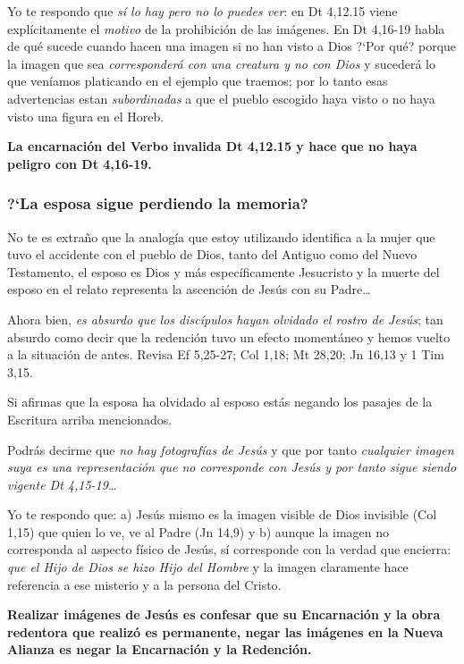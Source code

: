 \documentclass{article}
\begin{document}
Yo te respondo que \emph{s\'{i} lo hay pero no lo puedes ver}: en Dt 4,12.15 viene expl\'{i}citamente el \emph{motivo} de la prohibici\'on de las im\'agenes. En Dt 4,16-19 habla de qu\'e sucede cuando hacen una imagen si no han visto a Dios ?`Por qu\'e? porque la imagen que sea \emph{corresponder\'a con una creatura y no con Dios} y suceder\'a lo que ven\'{i}amos platicando en el ejemplo que traemos; por lo tanto esas advertencias estan \emph{subordinadas} a que el pueblo escogido haya visto o no haya visto una figura en el Horeb.

\textbf{La encarnaci\'on del Verbo invalida Dt 4,12.15 y hace que no haya peligro con Dt 4,16-19.}

\subsubsection{?`La esposa sigue perdiendo la memoria?}

No te es extra\~no que la analog\'{i}a que estoy utilizando identifica a la mujer que tuvo el accidente con el pueblo de Dios, tanto del Antiguo como del Nuevo Testamento, el esposo es Dios y m\'as espec\'{i}ficamente Jesucristo y la muerte del esposo en el relato representa la ascenci\'on de Jes\'us con su Padre\ldots

Ahora bien, \emph{es absurdo que los disc\'{i}pulos hayan olvidado el rostro de Jes\'us}; tan absurdo como decir que la redenci\'on tuvo un efecto moment\'aneo y hemos vuelto a la situaci\'on de antes. Revisa Ef 5,25-27; Col 1,18; Mt 28,20; Jn 16,13 y 1 Tim 3,15.

Si afirmas que la esposa ha olvidado al esposo est\'as negando los pasajes de la Escritura arriba mencionados.

Podr\'as decirme que \emph{no hay fotograf\'{i}as de Jes\'us} y que por tanto \emph{cualquier imagen suya es una representaci\'on que no corresponde con Jes\'us y por tanto sigue siendo vigente Dt 4,15-19}\ldots 

Yo te respondo que: a) Jes\'us mismo es la imagen visible de Dios invisible (Col 1,15) que quien lo ve, ve al Padre (Jn 14,9) y b) aunque la imagen no corresponda al aspecto f\'{i}sico de Jes\'us, s\'{i} corresponde con la verdad que encierra: \emph{que el Hijo de Dios se hizo Hijo del Hombre} y la imagen claramente hace referencia a ese misterio y a la persona del Cristo.

\textbf{Realizar im\'agenes de Jes\'us es confesar que su Encarnaci\'on y la obra redentora que realiz\'o es permanente, negar las im\'agenes en la Nueva Alianza es negar la Encarnaci\'on y la Redenci\'on.}
\end{document}
